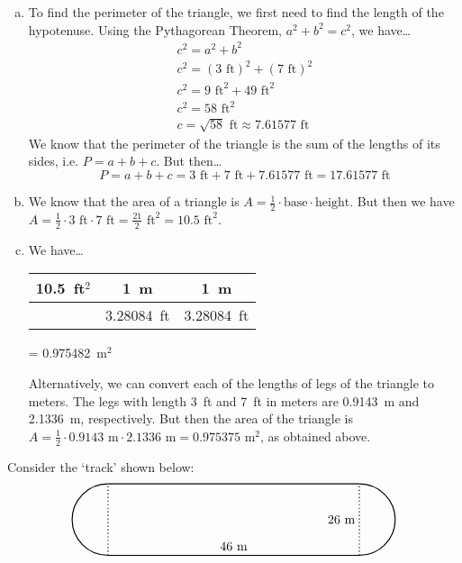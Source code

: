 \documentclass[11pt,letterpaper]{article}
\begin{document}
\sol 
\begin{enumerate}[(a)]
\item To find the perimeter of the triangle, we first need to find the length of the hypotenuse. Using the Pythagorean Theorem, $a^2 + b^2= c^2$, we have\dots
	\[
	\begin{gathered}
	c^2= a^2 + b^2 \\
	c^2= (3 \text{ ft})^2 + (7 \text{ ft})^2 \\
	c^2= 9 \text{ ft}^2 + 49 \text{ ft}^2 \\
	c^2= 58 \text{ ft}^2 \\
	c= \sqrt{58} \text{ ft} \approx 7.61577 \text{ ft}
	\end{gathered}
	\]
We know that the perimeter of the triangle is the sum of the lengths of its sides, i.e. $P= a + b + c$. But then\dots
	\[
	P= a + b + c= 3 \text{ ft} + 7 \text{ ft} + 7.61577 \text{ ft}= 17.61577 \text{ ft}
	\]

\item We know that the area of a triangle is $A= \frac{1}{2} \cdot \text{base} \cdot \text{height}$. But then we have $A= \frac{1}{2} \cdot 3 \text{ ft} \cdot 7 \text{ ft}= \frac{21}{2} \text{ ft}^2 = 10.5 \text{ ft}^2$. 

\item We have\dots \par
	\begin{table}[H]
	\centering
	\begin{tabular}{c||c|c}
	10.5~ft$^2$ & 1~m & 1~m \\ \hline
			   & 3.28084~ft & 3.28084~ft
	\end{tabular} = 0.975482~m$^2$
	\end{table} \par
Alternatively, we can convert each of the lengths of legs of the triangle to meters. The legs with length 3~ft and 7~ft in meters are 0.9143~m and 2.1336~m, respectively. But then the area of the triangle is $A= \frac{1}{2} \cdot 0.9143 \text{ m} \cdot 2.1336 \text{ m}=  0.975375 \text{ m}^2$, as obtained above. 
\end{enumerate}



\newpage



 Consider the `track' shown below:
	\[
	\begin{tikzpicture}
	\draw[line width=0.03cm] (0,0) -- (7,0);
	\draw[line width=0.03cm] (0,2) -- (7,2);
	
	\draw[line width=0.03cm,dotted] (0,0) -- (0,2);
	\draw[line width=0.03cm,dotted] (7,0) -- (7,2);
	 
	\draw[line width=0.03cm] (0,2) arc(90:270:1);
	\draw[line width=0.03cm] (7,0) arc(270:450:1);
	
	\node at (3.5,0.25) {$46$~m};
	\node at (6.5,1) {$26$~m};
	\end{tikzpicture}
	\]
\end{document}
